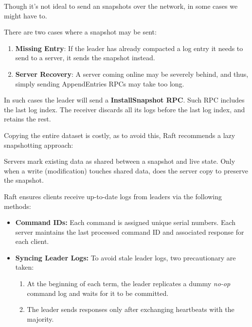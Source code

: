 \noindent
Though it's not ideal to send an snapshots over the network, in some cases we might have to.
\begin{Def}

    There are two cases where a snapshot may be sent:
    \begin{enumerate}
        \item \textbf{Missing Entry}: If the leader has already compacted a log entry it needs to send to a server, it sends the snapshot instead.
        \item \textbf{Server Recovery}: A server coming online may be severely behind, and thus, simply sending AppendEntries RPCs may take too long.
    \end{enumerate}

    \noindent
    In such cases the leader will send a \textbf{InstallSnapshot RPC}.
    Such RPC includes the last log index. The receiver discards all its logs before the last 
    log index, and retains the rest.
\end{Def}

\noindent
Copying the entire dataset is costly, as to avoid this, Raft recommends a lazy snapshotting approach:

\begin{Def}

    \noindent
    Servers mark existing data as shared between a snapshot and live state.
    Only when a write (modification) touches shared data, does the server copy to preserve the snapshot.
\end{Def}

\begin{Def}

    \noindent
    Raft ensures clients receive up-to-date logs from leaders via the following methods:

    \begin{itemize}
        \item \textbf{Command IDs:} Each command is assigned unique serial numbers. Each server maintains the last processed command ID and associated response for 
        each client.
        \item \textbf{Syncing Leader Logs:} To avoid stale leader logs, two precautionary are taken: 
        \begin{enumerate}
            \item At the beginning of each term, the leader replicates a dummy \textit{no-op} command log and waits for it to be committed.
            \item The leader sends responses only after exchanging heartbeats with the majority.
        \end{enumerate}
    \end{itemize}
\end{Def}
    
